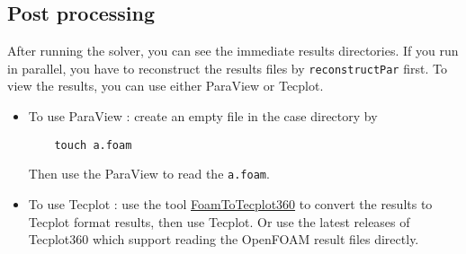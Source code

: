 \subsection{Post processing}
After running the solver, you can see the immediate results directories.
If you run in parallel, you have to reconstruct the results files by \verb|reconstructPar| first.
To view the results, you can use either ParaView or Tecplot.
\begin{itemize}
\item To use ParaView : create an empty file in the case directory by
\begin{verbatim}
    touch a.foam
\end{verbatim}
Then use the ParaView to read the \verb|a.foam|.
\item To use Tecplot : use the tool \href{https://openfoamwiki.net/index.php/FoamToTecplot360}{FoamToTecplot360} to convert the results to Tecplot format results, then use Tecplot.
 Or use the latest releases of Tecplot360 which support reading the OpenFOAM result files directly.
\end{itemize}